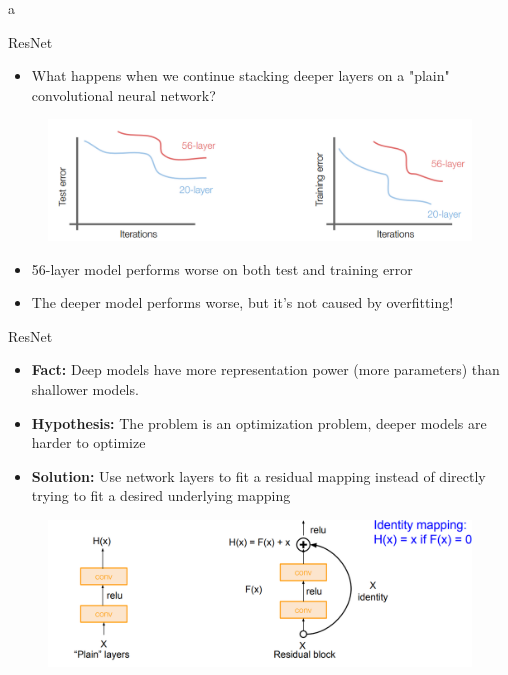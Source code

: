 a\documentclass[10pt]{beamer}
\theoremstyle{remark}
\theoremstyle{definition}
\begin{document}
\begin{frame}{ResNet}
\begin{itemize}
    \item What happens when we continue stacking deeper layers on a "plain" convolutional 
neural network?

\end{itemize}
\pause
\begin{figure}
\centering
\includegraphics[width=1.0\textwidth,height=0.5\textheight,keepaspectratio]{./images/resnet_2.png}
\end{figure}

\pause
\begin{itemize}
    \item 56-layer model performs worse on both test and training error
    \pause
    \item The deeper model performs worse, but it’s not caused by overfitting!
\end{itemize}

\end{frame}


\begin{frame}{ResNet}
\begin{itemize}
    \item \textbf{Fact:} Deep models have more representation power (more parameters) than shallower models.
    \pause
    \item \textbf{Hypothesis:} The problem is an optimization problem, deeper models are harder to optimize
    \pause
    \item \textbf{Solution:} Use network layers to fit a residual mapping instead of directly trying to fit a 
 desired underlying mapping

\end{itemize}
\pause
\begin{figure}
\centering
\includegraphics[width=1.0\textwidth,height=0.5\textheight,keepaspectratio]{./images/resnet_3.png}
\end{figure}


\end{frame}
\end{document}
